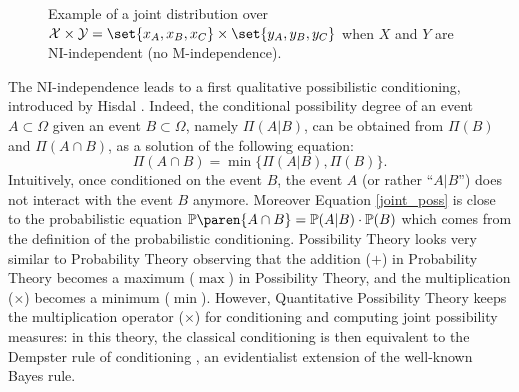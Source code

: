 \begin{figure}
\caption[Joint possibility distribution with NI-independence]{Example of a joint distribution over $\mathcal{X} \times \mathcal{Y} = \set{x_A,x_B,x_C} \times  \set{y_A,y_B,y_C}$ when $X$ and $Y$ are NI-independent
(no M-independence).} 
\label{figure_NIindep} 
\end{figure}



The NI-independence leads to a first qualitative possibilistic conditioning,
introduced by Hisdal \cite{Hisdal1978283}.
Indeed, the conditional possibility degree of an event $A \subset \Omega$ 
given an event $B \subset \Omega$,
namely $\Pi(A \vert B)$, can be obtained from $\Pi(B)$ and $\Pi(A \cap B)$,
as a solution of the following equation:
\begin{equation}
\label{joint_poss}
\Pi(A \cap B) = \min \Big\{ \Pi (A \vert B) , \Pi(B)  \Big\}.
\end{equation}
Intuitively, once conditioned on the event $B$,
the event $A$ (or rather ``$A \vert B$'') 
does not interact with the event $B$ anymore.
Moreover Equation \ref{joint_poss} is close to the probabilistic equation 
$\mathbb{P} \paren{ A \cap B } = \mathbb{P} (A \vert B) \cdot \mathbb{P} (B) $
which comes from the definition of the probabilistic conditioning.
Possibility Theory looks very similar to Probability Theory
observing that the addition ($+$) in Probability Theory becomes a maximum ($\max$)
in Possibility Theory, and the multiplication ($\times$)
becomes a minimum ($\min$). 
However, Quantitative Possibility Theory keeps the multiplication operator ($\times$)
for conditioning and computing joint possibility measures:
in this theory, the classical conditioning is then
equivalent to the Dempster rule of conditioning \cite{dempster1967},
an evidentialist extension of the well-known Bayes rule.

